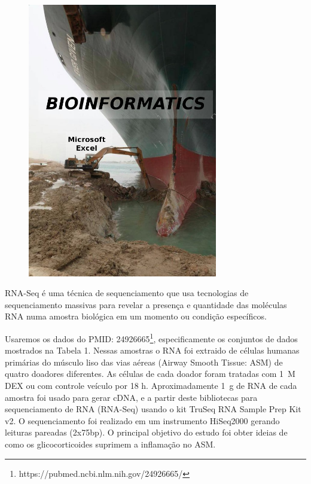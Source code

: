 \documentclass[letter,11pt]{book}
\begin{document}
\begin{figure}[h]
\centering
   \includegraphics[height=12cm]{Figs/bioinformatics_excel.jpg}
  \caption[O que é bioinformática?]{\label{bioinf_excel}}
\end{figure}

RNA-Seq é uma técnica de sequenciamento que usa tecnologias de sequenciamento massivas para revelar a presença e quantidade das moléculas RNA numa amostra biológica em um momento ou condição específicos.

Usaremos os dados do PMID: 24926665\footnote{https://pubmed.ncbi.nlm.nih.gov/24926665/}, especificamente os conjuntos de dados mostrados na Tabela 1. Nessas amostras o RNA foi extraido de células humanas primárias do músculo liso das vias aéreas (Airway Smooth Tissue: ASM) de quatro doadores diferentes. As células de cada doador foram tratadas com 1~{\textmu}M DEX ou com controle veículo por 18 h. Aproximadamente 1~{\textmu}g de RNA de cada amostra foi usado para gerar cDNA, e a partir deste bibliotecas para sequenciamento de RNA (RNA-Seq) usando o kit TruSeq RNA Sample Prep Kit v2. O sequenciamento foi realizado em um instrumento HiSeq2000 gerando leituras pareadas (2x75bp). O principal objetivo do estudo foi obter ideias de como os glicocorticoides suprimem a inflamação no ASM.
\end{document}
